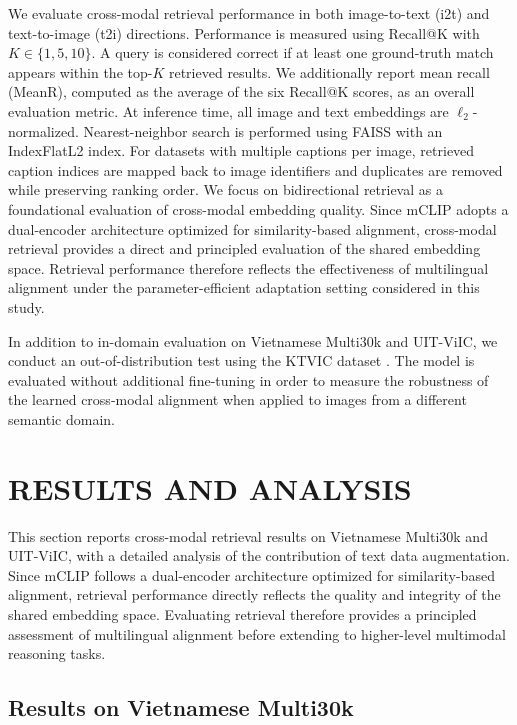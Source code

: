We evaluate cross-modal retrieval performance in both image-to-text (i2t) and text-to-image (t2i) directions. Performance is measured using Recall@K with $K \in \{1,5,10\}$. A query is considered correct if at least one ground-truth match appears within the top-$K$ retrieved results. We additionally report mean recall (MeanR), computed as the average of the six Recall@K scores, as an overall evaluation metric. At inference time, all image and text embeddings are $\ell_2$-normalized. Nearest-neighbor search is performed using FAISS with an IndexFlatL2 index. For datasets with multiple captions per image, retrieved caption indices are mapped back to image identifiers and duplicates are removed while preserving ranking order. We focus on bidirectional retrieval as a foundational evaluation of cross-modal embedding quality. Since mCLIP adopts a dual-encoder architecture optimized for similarity-based alignment, cross-modal retrieval provides a direct and principled evaluation of the shared embedding space. Retrieval performance therefore reflects the effectiveness of multilingual alignment under the parameter-efficient adaptation setting considered in this study.

In addition to in-domain evaluation on Vietnamese Multi30k and UIT-ViIC, we conduct an out-of-distribution test using the KTVIC dataset \cite{pham2024ktvicvietnameseimagecaptioning}. The model is evaluated without additional fine-tuning in order to measure the robustness of the learned cross-modal alignment when applied to images from a different semantic domain.



\section{RESULTS AND ANALYSIS}
\label{sec:results}
This section reports cross-modal retrieval results on Vietnamese Multi30k and UIT-ViIC, with a detailed analysis of the contribution of text data augmentation. Since mCLIP follows a dual-encoder architecture optimized for similarity-based alignment, retrieval performance directly reflects the quality and integrity of the shared embedding space. Evaluating retrieval therefore provides a principled assessment of multilingual alignment before extending to higher-level multimodal reasoning tasks.

\subsection{Results on Vietnamese Multi30k}


